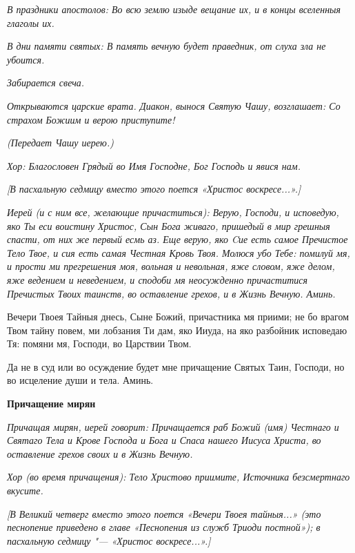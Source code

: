 \itshape В праздники апостолов:\normalfont{} Во всю землю изыде вещание их, и в концы вселенныя глаголы их.


\itshape В дни памяти святых:\normalfont{} В память вечную будет праведник, от слуха зла не убоится.


\itshape Забирается свеча\normalfont{}.


\itshape Открываются царские врата. Диакон, вынося Святую Чашу, возглашает:\normalfont{} Со страхом Божиим и верою приступите!


\itshape (Передает Чашу иерею.)\normalfont{}


\itshape Хор:\normalfont{} Благословен Грядый во Имя Господне, Бог Господь и явися нам.


\itshape [В пасхальную седмицу вместо этого поется «Христос воскресе...».]\normalfont{}


\itshape Иерей (и с ним все, желающие причаститься):\normalfont{} Верую, Господи, и исповедую, яко Ты еси воистину Христос, Сын Бога живаго, пришедый в мир грешныя спасти, от них же первый есмь аз. Еще верую, яко Cие есть самое Пречистое Тело Твое, и сия есть самая Честная Кровь Твоя. Молюся убо Тебе: помилуй мя, и прости ми прегрешения моя, вольная и невольная, яже словом, яже делом, яже ведением и неведением, и сподоби мя неосужденно причаститися Пречистых Твоих таинств, во оставление грехов, и в Жизнь Вечную. Аминь.


Вечери Твоея Тайныя днесь, Сыне Божий, причастника мя приими; не бо врагом Твом тайну повем, ми лобзания Ти дам, яко Ииуда, на яко разбойник исповедаю Тя: помяни мя, Господи, во Царствии Твом.


Да не в суд или во осуждение будет мне причащение Святых Таин, Господи, но во исцеление души и тела. Аминь.





\bfseries Причащение мирян\normalfont{}


\itshape Причащая мирян, иерей говорит:\normalfont{} Причащается раб Божий \itshape (имя)\normalfont{} Честнаго и Святаго Тела и Крове Господа и Бога и Спаса нашего Иисуса Христа, во оставление грехов своих и в Жизнь Вечную.


\itshape Хор (во время причащения)\normalfont{}: Тело Христово приимите, Источника безсмертнаго вкусите.


\itshape [В Великий четверг вместо этого поется «Вечери Твоея тайныя...» (это песнопение приведено в главе «Песнопения из служб Триоди постной»); в пасхальную седмицу "--- «Христос воскресе...».]\normalfont{}


